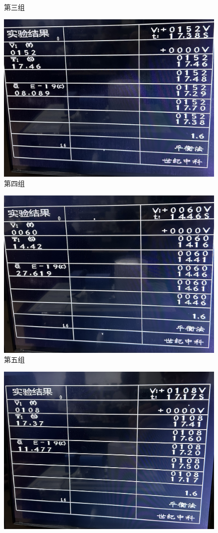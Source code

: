 \documentclass{WHUReport}
\begin{document}
\begin{multicols}{2}
\begin{figure}[H]
		\caption{第三组}
	\end{figure}
	\begin{figure}[H]
		\centering
		\includegraphics[width=0.8\linewidth]{figs/4.jpg}
		\caption{第四组}
	\end{figure}
	\begin{figure}[H]
		\centering
		\includegraphics[width=0.8\linewidth]{figs/5.jpg}
		\caption{第五组}
	\end{figure}
	\begin{figure}[H]
		\centering
		\includegraphics[width=0.8\linewidth]{figs/6.jpg}

\end{figure}
\end{multicols}
\end{document}
